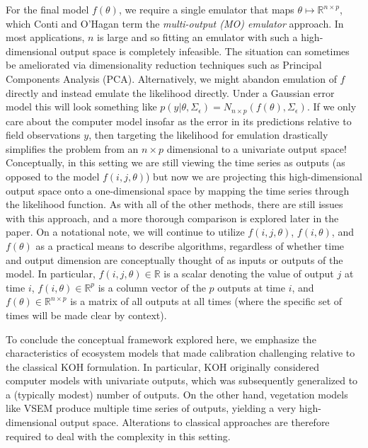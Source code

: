 \documentclass[12pt]{article}
\newcommand{\R}{\mathbb{R}}
\begin{document}
For the final model $f(\theta)$, we require a single emulator that maps $\theta \mapsto \R^{n \times p}$, which Conti and O'Hagan term the 
\textit{multi-output (MO) emulator} approach. In most applications, $n$ is large and so fitting an emulator 
with such a high-dimensional output space is completely infeasible. The situation can sometimes be ameliorated via dimensionality reduction techniques such as 
Principal Components Analysis (PCA). Alternatively, we might abandon emulation of $f$ directly and instead emulate the likelihood directly. Under a Gaussian error
model this will look something like $p(y|\theta, \Sigma_\epsilon) = N_{n \times p}(f(\theta), \Sigma_\epsilon)$. If we only care about the computer model insofar as 
the error in its predictions relative to field observations $y$, then targeting the likelihood for emulation drastically simplifies the problem from an $n \times p$ 
dimensional to a univariate output space! Conceptually, in this setting we are still viewing the time series as outputs (as opposed to the model $f(i, j, \theta)$) but now 
we are projecting this high-dimensional output space onto a one-dimensional space by mapping the time series through the likelihood function. As with all of the other
methods, there are still issues with this approach, and a more thorough comparison is explored later in the paper. On a notational note, we will continue to utilize 
$f(i, j, \theta)$, $f(i, \theta)$, and $f(\theta)$ as a practical means to describe algorithms, regardless of whether time and output dimension are conceptually thought 
of as inputs or outputs of the model. In particular, $f(i, j, \theta) \in \R$ is a scalar denoting the value of output $j$ at time $i$, $f(i, \theta) \in \R^p$ is a column vector 
of the $p$ outputs at time $i$, and $f(\theta) \in \R^{n \times p}$ is a matrix of all outputs at all times (where the specific set of times will be made clear by context). 

To conclude the conceptual framework 
explored here, we emphasize the characteristics of ecosystem models that made calibration challenging relative to the classical KOH formulation. In particular, KOH originally 
considered computer models with univariate outputs, which was subsequently generalized to a (typically modest) number of outputs. On the other hand, 
vegetation models like VSEM produce multiple time series of outputs, yielding a very high-dimensional output space. Alterations to classical approaches are therefore
required to deal with the complexity in this setting.  
\end{document}
